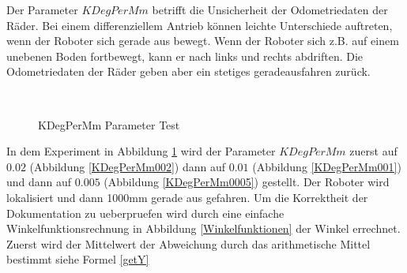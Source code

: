 \documentclass{article}
\begin{document}
\newpage
Der Parameter $KDegPerMm$ betrifft die Unsicherheit der Odometriedaten der R\"ader. Bei einem differenziellem Antrieb k\"onnen leichte Unterschiede auftreten, wenn der Roboter sich gerade aus bewegt. Wenn der Roboter sich z.B. auf einem unebenen Boden fortbewegt, kann er nach links und rechts abdriften. Die Odometriedaten der R\"ader geben aber ein stetiges geradeausfahren zur\"uck.

\begin{figure}
  \centering
  \ 
  \ 
  \caption{KDegPerMm Parameter Test}
  \label{KDegPerMmTestFigure}
\end{figure}
In dem Experiment in Abbildung \ref{KDegPerMmTestFigure} wird der Parameter $KDegPerMm$ zuerst auf $0.02$ (Abbildung \ref{KDegPerMm002}) dann auf $0.01$ (Abbildung \ref{KDegPerMm001}) und dann auf $0.005$ (Abbildung \ref{KDegPerMm0005}) gestellt. Der Roboter wird lokalisiert und dann 1000mm gerade aus gefahren. Um die Korrektheit der Dokumentation zu ueberpruefen wird
durch eine einfache Winkelfunktionsrechnung in Abbildung \ref{Winkelfunktionen} der Winkel errechnet. 
Zuerst wird der Mittelwert der Abweichung durch das arithmetische Mittel bestimmt siehe Formel \ref{getY}
\end{document}
